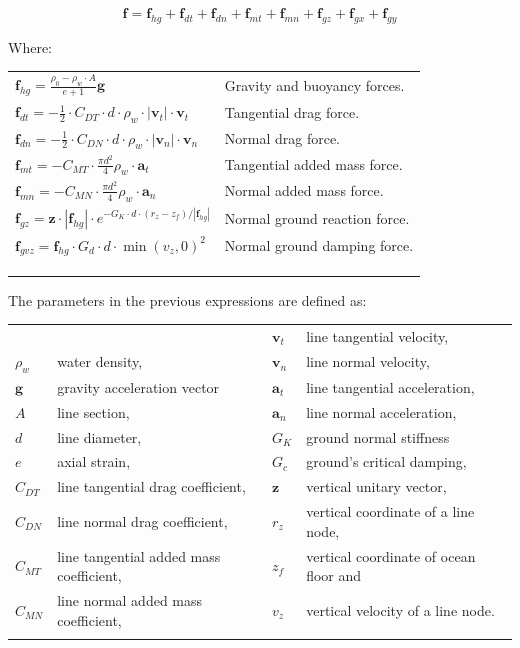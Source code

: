 \documentclass[10pt] {article}
\begin{document}
\begin{equation}
\mathbf{f}=\mathbf{f}_{hg}+\mathbf{f}_{dt}+\mathbf{f}_{dn}+\mathbf{f}_{mt}+\mathbf{f}_{mn}+\mathbf{f}_{gz}+\mathbf{f}_{gx}+\mathbf{f}_{gy} \label{f_ext} 
\end{equation}

Where:

\begin{tabular}{ll}
$\mathbf{f}_{hg}=\frac{\rho_0-\rho_w\cdot A}{e+1}\mathbf{g}$  &  Gravity and buoyancy forces. \\ 
$\mathbf{f}_{dt}=- \frac{1}{2} \cdot  C_{DT} \cdot d \cdot \rho_w \cdot |\mathbf{v}_t|\cdot \mathbf{v}_t$  &  Tangential drag force. \\ 
$\mathbf{f}_{dn}=- \frac{1}{2} \cdot C_{DN} \cdot d \cdot \rho_w \cdot |\mathbf{v}_n|\cdot \mathbf{v}_n$ &   Normal drag force. \\
$\mathbf{f}_{mt}=-C_{MT}\cdot \frac{\pi d^2}{4}\rho_w\cdot \mathbf{a}_t$  &  Tangential added mass force.\\
$\mathbf{f}_{mn}=-C_{MN}\cdot \frac{\pi d^2}{4}\rho_w\cdot \mathbf{a}_n$  &  Normal added mass force.\\
$\mathbf{f}_{gz}= \mathbf{z}\cdot|\mathbf{f}_{hg}| \cdot e^{- G_K \cdot d \cdot (r_z - z_f)/|\mathbf{f}_{hg}|}$  &  Normal ground reaction force. \\ 
$\mathbf{f}_{gvz}=\mathbf{f}_{hg}\cdot G_d \cdot d \cdot \min(v_z,0)^2$  & Normal ground damping force. \\ \\ \\ \\
\end{tabular}


The parameters in the previous expressions are defined as:\\

\begin{tabular}{llll}
$\quad$ & $\quad$ & $\mathbf{v}_t$ & line tangential velocity, \\
$\rho_w$ & water density, & $\mathbf{v}_n$ & line normal velocity, \\ 
$\mathbf{g}$ &gravity acceleration vector & $\mathbf{a}_t$ & line tangential acceleration, \\
$A$ & line section, & $\mathbf{a}_n$ & line normal acceleration, \\
$d$ & line diameter, & $G_K$ & ground normal stiffness \\
$e$ & axial strain, & $G_c$ & ground's critical damping, \\ 
$C_{DT}$ & line tangential drag coefficient, & $\mathbf{z}$ & vertical unitary vector, \\
$C_{DN}$ & line normal drag coefficient, & $r_z$ & vertical coordinate of a line node, \\ 
$C_{MT}$ & line tangential added mass coefficient, & $z_f$ & vertical coordinate of ocean floor and \\
$C_{MN}$ & line normal added mass coefficient, & $v_z$ & vertical velocity of a line node. \\ \\
\end{tabular}
\end{document}
